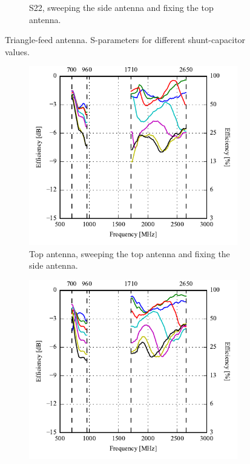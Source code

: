 \begin{figure}[htbp]
\begin{subfigure}{0.49\linewidth}
        \caption{S22, sweeping the side antenna and fixing the top antenna.}
    \end{subfigure}
    \caption{Triangle-feed antenna. S-parameters for different shunt-capacitor values.}
    \label{fig:triang_proto_sweep_sparams}
\end{figure}

\begin{figure}[htbp]
    \centering
    \begin{subfigure}{0.49\linewidth}
        \includegraphics{img/tech_sol/trianglefeed/mockup/sweep_efficiency_top.pdf}
        \caption{Top antenna, sweeping the top antenna and fixing the side antenna.}
    \end{subfigure}
    \hfill
    \begin{subfigure}{0.49\linewidth}
        \includegraphics{img/tech_sol/trianglefeed/mockup/sweep_efficiency_side.pdf}

\end{subfigure}
\end{figure}
